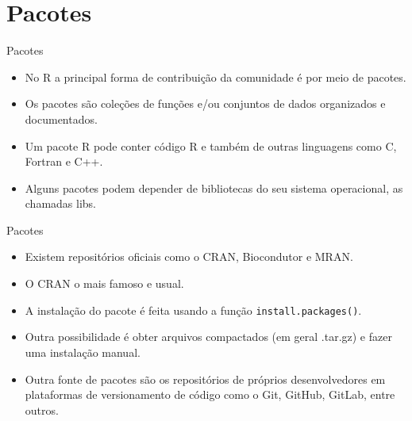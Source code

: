 \documentclass[
  ignorenonframetext,
  serif,
  professionalfont,
  usenames,
  dvipsnames,
  aspectratio = 169]{beamer}
\begin{document}
\hypertarget{pacotes}{%
\section{Pacotes}\label{pacotes}}

\begin{frame}{Pacotes}
\protect\hypertarget{pacotes-1}{}
\begin{itemize}
\item
  No R a principal forma de contribuição da comunidade é por meio de
  pacotes.
\item
  Os pacotes são coleções de funções e/ou conjuntos de dados organizados
  e documentados.
\item
  Um pacote R pode conter código R e também de outras linguagens como C,
  Fortran e C++.
\item
  Alguns pacotes podem depender de bibliotecas do seu sistema
  operacional, as chamadas libs.
\end{itemize}
\end{frame}

\begin{frame}[fragile]{Pacotes}
\protect\hypertarget{pacotes-2}{}
\begin{itemize}
\item
  Existem repositórios oficiais como o CRAN, Biocondutor e MRAN.
\item
  O CRAN o mais famoso e usual.
\item
  A instalação do pacote é feita usando a função
  \texttt{install.packages()}.
\item
  Outra possibilidade é obter arquivos compactados (em geral .tar.gz) e
  fazer uma instalação manual.
\item
  Outra fonte de pacotes são os repositórios de próprios desenvolvedores
  em plataformas de versionamento de código como o Git, GitHub, GitLab,
  entre outros.
\end{itemize}
\end{frame}
\end{document}
